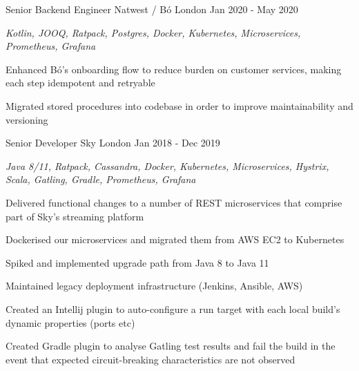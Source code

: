 \begin{cventries}
  \cventry
    {Senior Backend Engineer} %
    {Natwest / Bó} %
    {London} %
    {Jan 2020 - May 2020} %
    {
      \begin{cvitems} %
        \item {\itshape{Kotlin, JOOQ, Ratpack, Postgres, Docker, Kubernetes, Microservices, Prometheus, Grafana}}
        \item {Enhanced Bó's onboarding flow to reduce burden on customer services, making each step idempotent and retryable}
        \item {Migrated stored procedures into codebase in order to improve maintainability and versioning}
      \end{cvitems}
    }

  \cventry
    {Senior Developer} %
    {Sky} %
    {London} %
    {Jan 2018 - Dec 2019} %
    {
      \begin{cvitems} %
        \item {\itshape{Java 8/11, Ratpack, Cassandra, Docker, Kubernetes, Microservices, Hystrix, Scala, Gatling, Gradle, Prometheus, Grafana}}
        \item {Delivered functional changes to a number of REST microservices that comprise part of Sky’s streaming platform}
        \item {Dockerised our microservices and migrated them from AWS EC2 to Kubernetes}
        \item {Spiked and implemented upgrade path from Java 8 to Java 11}
        \item {Maintained legacy deployment infrastructure (Jenkins, Ansible, AWS)}
        \item {Created an Intellij plugin to auto-configure a run target with each local build's dynamic properties (ports etc)}
        \item {Created Gradle plugin to analyse Gatling test results and fail the build in the event that expected circuit-breaking characteristics are not observed}
      \end{cvitems}
    }


\end{cventries}
